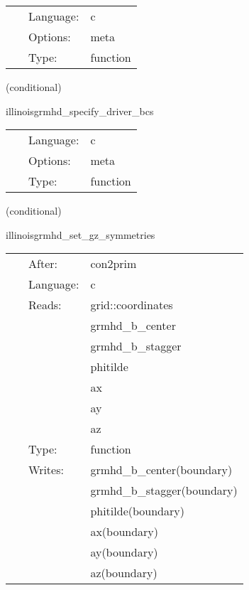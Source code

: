 \hspace{5mm}{\it register evolved, rhs variables in illinoisgrmhd for mol } 


\hspace{5mm}

 \begin{tabular*}{160mm}{cll} 
~ & Language:  & c \\ 
~ & Options:  & meta \\ 
~ & Type:  & function \\ 
\end{tabular*} 


\vspace{5mm}

   (conditional) 

\hspace{5mm} illinoisgrmhd\_specify\_driver\_bcs 

\hspace{5mm}{\it register boundary conditions with presync } 


\hspace{5mm}

 \begin{tabular*}{160mm}{cll} 
~ & Language:  & c \\ 
~ & Options:  & meta \\ 
~ & Type:  & function \\ 
\end{tabular*} 


\vspace{5mm}

   (conditional) 

\hspace{5mm} illinoisgrmhd\_set\_gz\_symmetries 

\hspace{5mm}{\it compute post-initialdata quantities } 


\hspace{5mm}

 \begin{tabular*}{160mm}{cll} 
~ & After:  & con2prim \\ 
~ & Language:  & c \\ 
~ & Reads:  & grid::coordinates \\ 
~& ~ &grmhd\_b\_center\\ 
~& ~ &grmhd\_b\_stagger\\ 
~& ~ &phitilde\\ 
~& ~ &ax\\ 
~& ~ &ay\\ 
~& ~ &az\\ 
~ & Type:  & function \\ 
~ & Writes:  & grmhd\_b\_center(boundary) \\ 
~& ~ &grmhd\_b\_stagger(boundary)\\ 
~& ~ &phitilde(boundary)\\ 
~& ~ &ax(boundary)\\ 
~& ~ &ay(boundary)\\ 
~& ~ &az(boundary)\\ 
\end{tabular*} 


